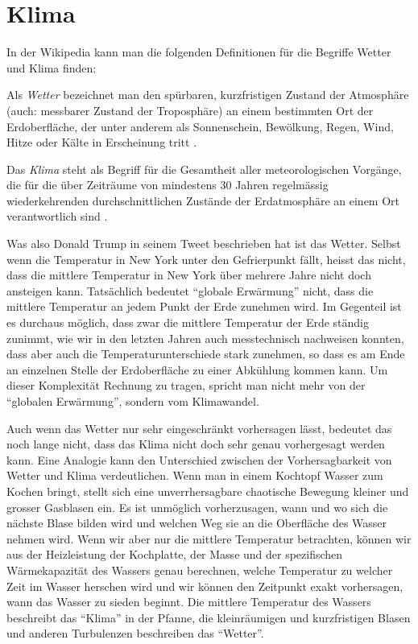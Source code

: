 %
%
%

\section{Klima\label{section:klima}}
In der Wikipedia kann man die folgenden Definitionen für die Begriffe Wetter
und Klima finden:

\begin{definition}
Als {\em Wetter} bezeichnet man den
spürbaren, kurzfristigen Zustand der Atmosphäre (auch: messbarer
Zustand der Troposphäre) an einem bestimmten Ort der Erdoberfläche,
der unter anderem als Sonnenschein, Bewölkung, Regen, Wind, Hitze
oder Kälte in Erscheinung tritt
\cite{skript:wetter}.
\end{definition}

\begin{definition}
Das {\em Klima} steht als Begriff für die Gesamtheit aller meteorologischen
Vorgänge, die für die über Zeiträume von mindestens 30 Jahren
regelmässig wiederkehrenden durchschnittlichen Zustände der Erdatmosphäre
an einem Ort verantwortlich sind
\cite{skript:klima}.
\end{definition}

Was also Donald Trump in seinem Tweet beschrieben hat ist das Wetter.
Selbst wenn die Temperatur in New York unter den Gefrierpunkt fällt, 
heisst das nicht, dass die mittlere Temperatur in New York über mehrere
Jahre nicht doch ansteigen kann.
Tatsächlich bedeutet ``globale Erwärmung'' nicht, dass die mittlere
Temperatur an jedem Punkt der Erde zunehmen wird.
Im Gegenteil ist es durchaus möglich, dass zwar die mittlere Temperatur
der Erde ständig zunimmt, wie wir in den letzten Jahren auch messtechnisch
nachweisen konnten, dass aber auch die Temperaturunterschiede stark zunehmen,
so dass es am Ende an einzelnen Stelle der Erdoberfläche zu einer 
Abkühlung kommen kann.
Um dieser Komplexität Rechnung zu tragen, spricht man nicht mehr von
der ``globalen Erwärmung'', sondern vom Klimawandel.

Auch wenn das Wetter nur sehr eingeschränkt vorhersagen lässt,
bedeutet das noch lange nicht, dass das Klima nicht doch sehr
genau vorhergesagt werden kann.
Eine Analogie kann den Unterschied zwischen der Vorhersagbarkeit
von Wetter und Klima verdeutlichen.
Wenn man in einem Kochtopf Wasser zum Kochen bringt, stellt sich
eine unverrhersagbare chaotische Bewegung kleiner und grosser
Gasblasen ein.
Es ist unmöglich vorherzusagen, wann und wo sich die nächste Blase
bilden wird und welchen Weg sie an die Oberfläche des Wasser nehmen
wird.
Wenn wir aber nur die mittlere Temperatur betrachten, können wir
aus der Heizleistung der Kochplatte, der Masse und der spezifischen
Wärmekapazität des Wassers genau berechnen, welche Temperatur zu welcher
Zeit im Wasser herschen wird und wir können den Zeitpunkt exakt
vorhersagen, wann das Wasser zu sieden beginnt.
Die mittlere Temperatur des Wassers beschreibt das ``Klima''
in der Pfanne, die kleinräumigen und kurzfristigen Blasen und anderen
Turbulenzen beschreiben das ``Wetter''.

